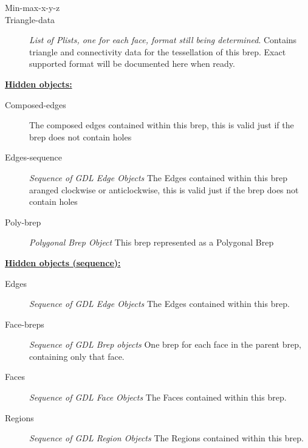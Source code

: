 \documentclass [11pt]{book}
\begin{document}
\begin{itemize}
\begin{description}
\item [Min-max-x-y-z]

\item [Triangle-data]
\emph{List of Plists, one for each face, format still being determined}.
Contains triangle and connectivity data for the tessellation
of this brep. Exact supported format will be documented here when ready.


\end{description}






\textbf{
\underline{Hidden objects:}}

\begin{description}

\item [Composed-edges]
The composed edges contained within this brep, this is valid just if the brep does not contain holes


\item [Edges-sequence]
\emph{Sequence of GDL Edge Objects} The Edges contained within this brep aranged clockwise or anticlockwise,
this is valid just if the brep does not contain holes


\item [Poly-brep]
\emph{Polygonal Brep Object} This brep represented as a Polygonal Brep


\end{description}






\textbf{
\underline{Hidden objects (sequence):}}

\begin{description}

\item [Edges]
\emph{Sequence of GDL Edge Objects} The Edges contained within this brep.


\item [Face-breps]
\emph{Sequence of GDL Brep objects} One brep for each face in the parent brep, containing only that face.


\item [Faces]
\emph{Sequence of GDL Face Objects} The Faces contained within this brep.


\item [Regions]
\emph{Sequence of GDL Region Objects} The Regions contained within this brep.



\end{description}
\end{itemize}
\end{document}
